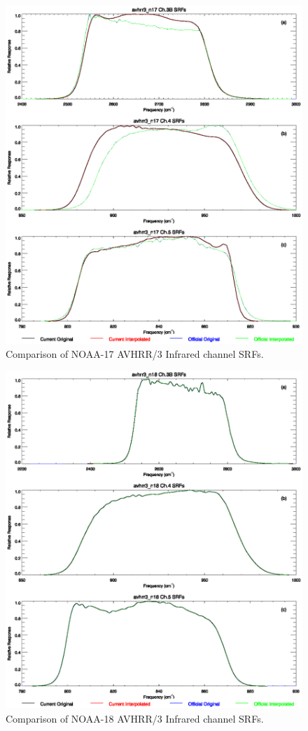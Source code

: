 \begin{figure}[htp]
  \centering
  \includegraphics[scale=1]{graphics/nominal/avhrr3_n17.srf.eps}
  \caption{Comparison of NOAA-17 AVHRR/3 Infrared channel SRFs.}
  \label{fig:avhrr3_n17}
\end{figure}

\begin{figure}[htp]
  \centering
  \includegraphics[scale=1]{graphics/nominal/avhrr3_n18.srf.eps}
  \caption{Comparison of NOAA-18 AVHRR/3 Infrared channel SRFs.}
  \label{fig:avhrr3_n18}
\end{figure}

